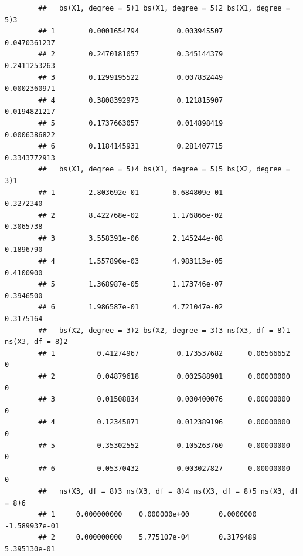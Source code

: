 \begin{knitrout}\scriptsize
	\color{fgcolor}\begin{kframe}
		\begin{alltt}
			 \hlkwb{<-} \hlopt{::}\hlstd{(}\hlopt{~}  \hlopt{+}    \hlstd{=} \hlstd{)} \hlopt{+}   \hlstd{=} \hlstd{)} \hlopt{+}   \hlstd{=} \hlstd{)} \hlopt{+}
			  \hlstd{=} \hlstd{)} \hlopt{+}  \hlopt{+} \hlstd{)} \hlopt{+}   
		\end{alltt}
		\begin{verbatim}
		##   bs(X1, degree = 5)1 bs(X1, degree = 5)2 bs(X1, degree = 5)3
		## 1        0.0001654794         0.003945507        0.0470361237
		## 2        0.2470181057         0.345144379        0.2411253263
		## 3        0.1299195522         0.007832449        0.0002360971
		## 4        0.3808392973         0.121815907        0.0194821217
		## 5        0.1737663057         0.014898419        0.0006386822
		## 6        0.1184145931         0.281407715        0.3343772913
		##   bs(X1, degree = 5)4 bs(X1, degree = 5)5 bs(X2, degree = 3)1
		## 1        2.803692e-01        6.684809e-01           0.3272340
		## 2        8.422768e-02        1.176866e-02           0.3065738
		## 3        3.558391e-06        2.145244e-08           0.1896790
		## 4        1.557896e-03        4.983113e-05           0.4100900
		## 5        1.368987e-05        1.173746e-07           0.3946500
		## 6        1.986587e-01        4.721047e-02           0.3175164
		##   bs(X2, degree = 3)2 bs(X2, degree = 3)3 ns(X3, df = 8)1 ns(X3, df = 8)2
		## 1          0.41274967         0.173537682      0.06566652               0
		## 2          0.04879618         0.002588901      0.00000000               0
		## 3          0.01508834         0.000400076      0.00000000               0
		## 4          0.12345871         0.012389196      0.00000000               0
		## 5          0.35302552         0.105263760      0.00000000               0
		## 6          0.05370432         0.003027827      0.00000000               0
		##   ns(X3, df = 8)3 ns(X3, df = 8)4 ns(X3, df = 8)5 ns(X3, df = 8)6
		## 1     0.000000000    0.000000e+00       0.0000000   -1.589937e-01
		## 2     0.000000000    5.775107e-04       0.3179489    5.395130e-01

\end{verbatim}
\end{kframe}
\end{knitrout}
